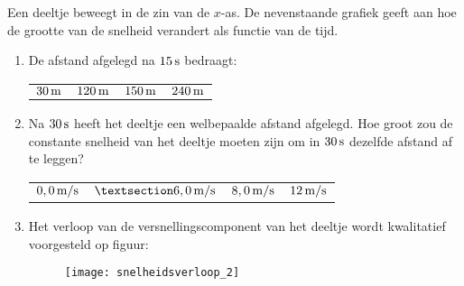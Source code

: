 \begin{exercise} 
\begin{minipage}[t]{0.6\textwidth}
Een deeltje beweegt in de zin van de $x$-as. De nevenstaande grafiek geeft aan hoe de grootte van de snelheid verandert als functie van de tijd.
\begin{enumerate}
\item De afstand afgelegd na $15\rm\,s$ bedraagt:
\newline
\begin{tabularx}{\textwidth}{XXXX}
$30\rm\,m$&$120\rm\,m$&$150\rm\,m$&$240\rm\,m$
\end{tabularx}
\item Na $30\rm\,s$ heeft het deeltje een welbepaalde afstand afgelegd. Hoe groot zou de constante snelheid van het deeltje moeten zijn om in $30\rm\,s$ dezelfde afstand af te leggen?
\newline
\begin{tabularx}{\textwidth}{XXXX}
$0,0\rm\,m/s$&$§6,0\rm\,m/s$&$8,0\rm\,m/s$&$12\rm\,m/s$
\end{tabularx}
\end{enumerate}
\end{minipage}
\hspace{2mm}
\begin{minipage}[t]{0.3\textwidth}
\end{minipage}
\begin{enumerate}
\setcounter{enumii}{2}
\item Het verloop van de versnellingscomponent van het deeltje wordt kwalitatief voorgesteld op figuur:
\begin{figure}[h]
\begin{flushright}
\texttt{[image: snelheidsverloop\_2]}
\end{flushright}
\end{figure}
\end{enumerate}

\end{exercise}

